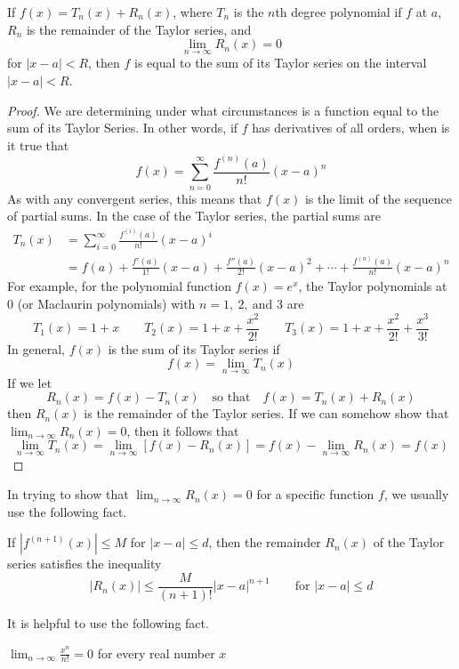   \begin{theorem}
    If $f(x) = T_n (x)+ R_n (x)$, where $T_n$ is the $n$th degree polynomial if $f$ at $a$, $R_n$ is the remainder of the Taylor series, and
    $$\lim_{n\to\infty} R_n (x) = 0 $$
    for $|x-a|<R$, then $f$ is equal to the sum of its Taylor series on the interval $|x-a|<R$.
  \end{theorem}
  \begin{proof}\let\qed\relax
    We are determining under what circumstances is a function equal to the sum of its Taylor Series. In other words, if $f$ has derivatives of all orders, when is it true that
    $$f(x) = \sum_{n=0}^{\infty} \frac{f^{(n)}(a)}{n!}(x-a)^n $$
    As with any convergent series, this means that $f(x)$ is the limit of the sequence of partial sums. In the case of the Taylor series, the partial sums are
    \begin{align*}
      T_n (x) &= \sum_{i=0}^{\infty} \frac{f^{(i)}(a)}{n!}(x-a)^i \\
      &= f(a) + \frac{f'(a)}{1!}(x-a) + \frac{f''(a)}{2!}(x-a)^2 + \cdots + \frac{f^{(n)}(a)}{n!}(x-a)^n
    \end{align*}
    For example, for the polynomial function $f(x) = e^x$, the Taylor polynomials at 0 (or Maclaurin polynomials) with $n=1,\ 2,\ \text{and } 3$ are
    $$ T_1 (x)=1+x \qquad T_2 (x)=1+x + \frac{x^2}{2!} \qquad T_3 (x)=1+x +\frac{x^2}{2!} +\frac{x^3}{3!} $$
    In general, $f(x)$ is the sum of its Taylor series if $$f(x) = \lim_{n\to\infty} T_n (x) $$
    If we let $$ R_n (x) = f(x) - T_n (x) \quad\text{so that}\quad f(x) = T_n (x) + R_n (x) $$
    then $R_n (x)$ is the remainder of the Taylor series. If we can somehow show that $\lim_{n\to\infty} R_n (x) = 0 $, then it follows that
    $$\lim_{n\to\infty} T_n (x) = \lim_{n\to\infty} [f(x) - R_n (x)]  = f(x) - \lim_{n\to\infty} R_n (x) = f(x) $$
  \end{proof}
  In trying to show that $\lim_{n\to\infty} R_n (x) = 0 $ for a specific function $f$, we usually use the following fact.
  \begin{definition}
    If $|f^{(n+1)}(x)| \leq M$ for $|x-a| \leq d$, then the remainder $R_n (x)$ of the Taylor series satisfies the inequality
    $$|R_n (x)| \leq \frac{M}{(n+1)!}|x-a|^{n+1} \qquad\text{for } |x-a| \leq d $$
  \end{definition}
  It is helpful to use the following fact.
  \begin{definition}
    $\displaystyle\lim_{n\to\infty} \frac{x^n}{n!} = 0$ \quad for every real number $x$
  \end{definition}
